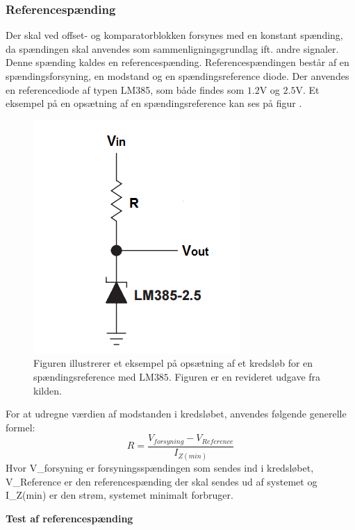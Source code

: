 \subsubsection{Referencespænding}
Der skal ved offset- og komparatorblokken forsynes med en konstant spænding, da spændingen skal anvendes som sammenligningsgrundlag ift. andre signaler. Denne spænding kaldes en referencespænding. Referencespændingen består af en spændingsforsyning, en modstand og en spændingsreference diode. Der anvendes en referencediode af typen LM385, som både findes som $1.2$V og $2.5$V. Et eksempel på en opsætning af en spændingsreference kan ses på figur .

\begin{figure}[H]
	\centering
	\includegraphics[scale=1.0]{figures/cProblemloesning/ReferenceEksempel}
	\caption{Figuren illustrerer et eksempel på opsætning af et kredsløb for en spændingsreference med LM$385$. Figuren er en revideret udgave fra kilden. \cite{Instruments2005}}
	\label{fig:Spaendingsreference}
\end{figure}

For at udregne værdien af modstanden i kredsløbet, anvendes følgende generelle formel:
\begin{equation}
R=\dfrac{V_{forsyning}-V_{Reference}}{I_{Z(min)}}
\end{equation}
Hvor V_{forsyning} er forsyningsspændingen som sendes ind i kredsløbet, V_{Reference} er den referencespænding der skal sendes ud af systemet og I_{Z(min)} er den strøm, systemet minimalt forbruger.

\textbf{Test af referencespænding}


 